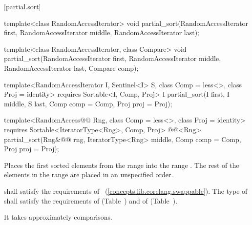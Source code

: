 [partial.sort]{}

%
\begin{removedblock}
\begin{itemdecl}
template<class RandomAccessIterator>
  void partial_sort(RandomAccessIterator first,
                    RandomAccessIterator middle,
                    RandomAccessIterator last);

template<class RandomAccessIterator, class Compare>
  void partial_sort(RandomAccessIterator first,
                    RandomAccessIterator middle,
                    RandomAccessIterator last,
                    Compare comp);
\end{itemdecl}
\end{removedblock}
\begin{addedblock}
\begin{itemdecl}
template<RandomAccessIterator I, Sentinel<I> S, class Comp = less<>,
    class Proj = identity>
  requires Sortable<I, Comp, Proj>
  I partial_sort(I first, I middle, S last, Comp comp = Comp{}, Proj proj = Proj{});

template<RandomAccess@@ Rng, class Comp = less<>, class Proj = identity>
  requires Sortable<IteratorType<Rng>, Comp, Proj>
  @@<Rng>
    partial_sort(Rng&@\newtxt{\&}@ rng, IteratorType<Rng> middle, Comp comp = Comp{},
                 Proj proj = Proj{});
\end{itemdecl}
\end{addedblock}

\begin{itemdescr}
\pnum
\effects
Places the first
sorted elements from the range
into the range
.
The rest of the elements in the range
are placed in an unspecified order.
%

\begin{removedblock}
\pnum
\requires
{} shall satisfy the requirements of
~(\ref{concepts.lib.corelang.swappable}). The type
of  shall satisfy the requirements of
 (Table~) and of
 (Table~).
\end{removedblock}

\pnum
\complexity
It takes approximately
comparisons.
\end{itemdescr}

